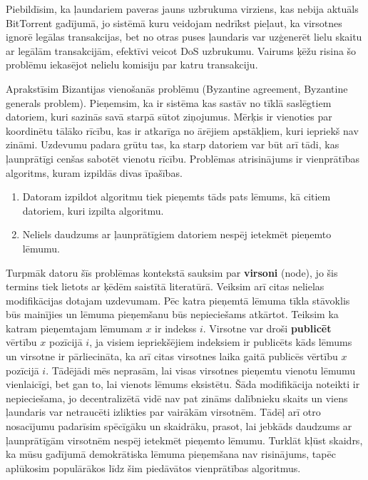 Piebildīsim, ka ļaundariem paveras jauns uzbrukuma virziens, kas nebija aktuāls BitTorrent gadījumā, jo sistēmā kuru veidojam nedrīkst pieļaut, ka virsotnes ignorē legālas transakcijas, bet no otras puses ļaundaris var uzģenerēt lielu skaitu ar legālām transakcijām, efektīvi veicot DoS uzbrukumu. Vairums ķēžu risina šo problēmu iekasējot nelielu komisiju par katru transakciju.

Aprakstīsim Bizantijas vienošanās problēmu (Byzantine agreement, Byzantine generals problem).
Pieņemsim, ka ir sistēma kas sastāv no tīklā saslēgtiem datoriem, kuri sazinās savā starpā sūtot ziņojumus. Mērķis ir vienoties par koordinētu tālāko rīcību, kas ir atkarīga no ārējiem apstākļiem, kuri iepriekš nav zināmi. Uzdevumu padara grūtu tas, ka starp datoriem var būt arī tādi, kas ļaunprātīgi cenšas sabotēt vienotu rīcību.
Problēmas atrisinājums ir vienprātības algoritms, kuram izpildās divas īpašības.
\begin{enumerate}
    \item Datoram izpildot algoritmu tiek pieņemts tāds pats lēmums, kā citiem datoriem, kuri izpilta algoritmu.
    \item Neliels daudzums ar ļaunprātīgiem datoriem nespēj ietekmēt pieņemto lēmumu.
\end{enumerate}\cite{lamport82}
Turpmāk datoru šīs problēmas kontekstā sauksim par \textbf{virsoni} (node), jo šis termins tiek lietots ar ķēdēm saistītā literatūrā. Veiksim arī citas nelielas modifikācijas dotajam uzdevumam.
Pēc katra pieņemtā lēmuma tīkla stāvoklis būs mainījies un lēmuma pieņemšanu būs nepieciešams atkārtot. Teiksim ka katram pieņemtajam lēmumam $x$ ir indekss $i$. Virsotne var droši \textbf{publicēt} vērtību $x$ pozīcijā $i$, ja visiem iepriekšējiem indeksiem ir publicēts kāds lēmums un virsotne ir pārliecināta, ka arī citas virsotnes laika gaitā publicēs vērtību $x$ pozīcijā $i$.\cite{mazieres15} Tādējādi mēs neprasām, lai visas virsotnes pieņemtu vienotu lēmumu vienlaicīgi, bet gan to, lai vienots lēmums eksistētu. Šāda modifikācija noteikti ir nepieciešama, jo decentralizētā vidē nav pat zināms dalībnieku skaits un viens ļaundaris var netraucēti izlikties par vairākām virsotnēm.
Tādēļ arī otro nosacījumu padarīsim spēcīgāku un skaidrāku, prasot, lai jebkāds daudzums ar ļaunprātīgām virsotnēm nespēj ietekmēt pieņemto lēmumu.
Turklāt kļūst skaidrs, ka mūsu gadījumā demokrātiska lēmuma pieņemšana nav risinājums, tapēc aplūkosim populārākos līdz šim piedāvātos vienprātības algoritmus.

